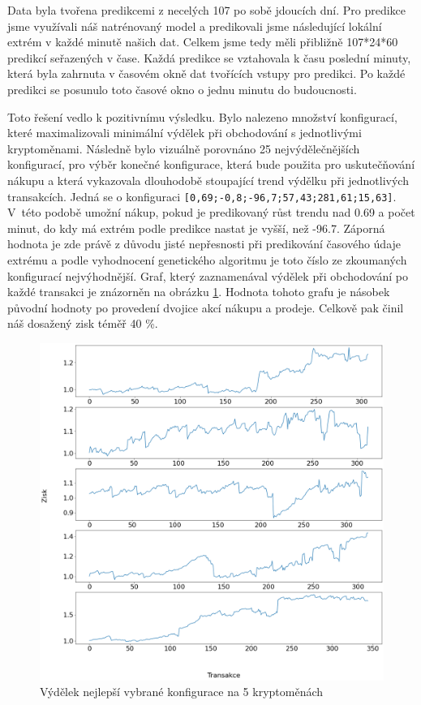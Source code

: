 Data byla tvořena predikcemi z necelých 107 po sobě jdoucích dní. 
Pro predikce jsme využívali náš natrénovaný model a predikovali jsme následující lokální extrém v každé minutě našich dat. 
Celkem jsme tedy měli přibližně 107*24*60 predikcí seřazených v čase. 
Každá predikce se vztahovala k času poslední minuty, která byla zahrnuta v časovém okně dat tvořících vstupy pro predikci. 
Po každé predikci se posunulo toto časové okno o jednu minutu do budoucnosti. 

Toto řešení vedlo k pozitivnímu výsledku. Bylo nalezeno množství konfigurací, které maximalizovali minimální výdělek při obchodování s jednotlivými kryptoměnami. 
Následně bylo vizuálně porovnáno 25 nejvýdělečnějších konfigurací, pro výběr konečné konfigurace, která bude použita pro uskutečňování nákupu a která vykazovala dlouhodobě stoupající trend výdělku při jednotlivých transakcích. 
Jedná se o konfiguraci \verb|[0,69;-0,8;-96,7;57,43;281,61;15,63]|. 
V~této podobě umožní nákup, pokud je predikovaný růst trendu nad 0.69 a počet minut, do kdy má extrém podle predikce nastat je vyšší, než -96.7. 
Záporná hodnota je zde právě z důvodu jisté nepřesnosti při predikování časového údaje extrému a podle vyhodnocení genetického algoritmu je toto číslo ze zkoumaných konfigurací nejvýhodnější.
Graf, který zaznamenával výdělek při obchodování po každé transakci je znázorněn na obrázku \ref{best_config}.
Hodnota tohoto grafu je násobek původní hodnoty po provedení dvojice akcí nákupu a prodeje.
Celkově pak činil náš dosažený zisk téměř 40 \%. 

\begin{figure}
    \caption{Výdělek nejlepší vybrané konfigurace na 5 kryptoměnách}
    \label{best_config}
    \centering
    \includegraphics[width=\textwidth]{best_config.png}
\end{figure}


